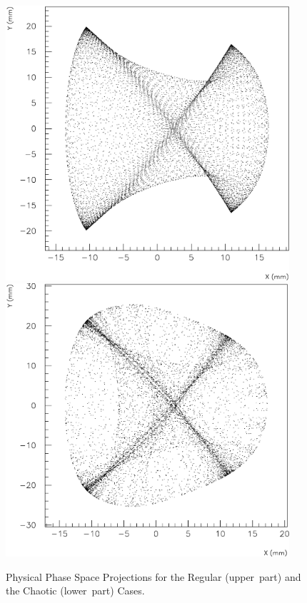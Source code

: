 \begin{figure}[H]
\begin{center}
  \mbox{\includegraphics*[width=10.5cm]{figures/exp4}}
  \\[5mm]
  \mbox{\includegraphics*[width=10.5cm]{figures/exp12}}
 \caption{Physical Phase Space Projections for the Regular
   \mbox{(upper part)} and the Chaotic \mbox{(lower part)} Cases.}
 \label{P-proj}
\end{center}
\end{figure}

